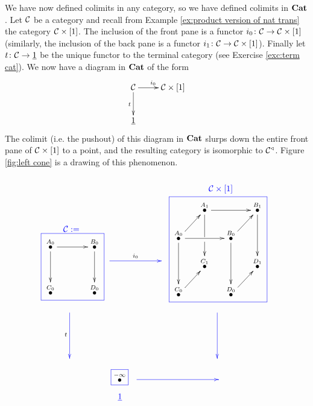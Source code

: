 \documentclass[CT4S-EN-RU]{subfiles}
\begin{document}
\begin{exampleENG}
We have now defined colimits in any category, so we have defined colimits in ${\mathbf{Cat}}$. Let $\mathcal{C}$ be a category and recall from Example \ref{ex:product version of nat trans} the category $\mathcal{C}\times[1]$. The inclusion of the front pane is a functor $i_0\colon\mathcal{C}\rightarrow\mathcal{C}\times[1]$ (similarly, the inclusion of the back pane is a functor $i_1\colon\mathcal{C}\rightarrow\mathcal{C}\times[1]$). Finally let $t\colon\mathcal{C}\rightarrow\underline{1}$ be the unique functor to the terminal category (see Exercise \ref{exc:term cat}). We now have a diagram in ${\mathbf{Cat}}$ of the form 
$$\xymatrix{\mcC\ar[r]^{i_0}\ar[d]_{t}&\mcC\times[1]\\\ul{1}}$$
The colimit (i.e. the pushout) of this diagram in ${\mathbf{Cat}}$ slurps down the entire front pane of $\mathcal{C}\times[1]$ to a point, and the resulting category is isomorphic to $\mathcal{C}^\triangleleft$. Figure \ref{fig:left cone} is a drawing of this phenomenon.
\begin{figure}[H]
$$
\parbox{1in}{~\vspace{.6in}\boxtitle{\color{blue}{$\mcC:=$}}\cfbox{blue}{\parbox{.7in}{\xymatrix@=15pt{
\LMO{A_0}\ar[rr]\ar[dd]&&\LMO{B_0}\ar[dd]\\\\\LMO{C_0}&&\LMO{D_0}
}}}}
\parbox{1.1in}{~\vspace{.6in}\\\xymatrix{~\ar@[blue][rr]^{i_0}&\hspace{.1in}&~}}
\parbox{1.7in}{\boxtitle{\color{blue}{$\mcC\times[1]$}}\cfbox{blue}{\parbox{1.4in}{\xymatrix@=15pt{
&\LMO{A_1}\ar[rr]\ar'[d][dd]&&\LMO{B_1}\ar[dd]\\
\LMO{A_0}\ar[ur]\ar[rr]\ar[dd]&&\LMO{B_0}\ar[ur]\ar[dd]\\
&\LMO{C_1}&&\LMO{D_1}\\
\LMO{C_0}\ar[ur]&&\LMO{D_0}\ar[ur]&
}}}}
$$
$$
\hspace{-.5in}\xymatrix{~\ar@[blue][dd]_t\\\\~}\hspace{2.3in}\xymatrix{~\ar@[blue][dd]\\\\~}
$$
$$
\hspace{.4in}\parbox{.3in}{\cfbox{blue}{$\LMO{-\infty}$}\begin{center}\color{blue}{$\ul{1}$}\end{center}}
\parbox{1.6in}{\xymatrix{~\ar@[blue][rr]&\hspace{.6in}&~}\vspace{.15in}~}
$$
\end{figure}
\end{exampleENG}
\end{document}
